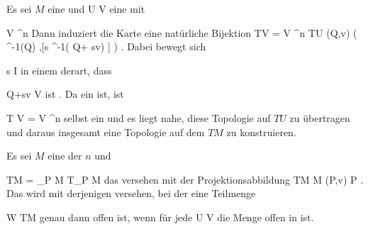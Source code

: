 {

Es sei $M$ eine
und
\maabbdisp {\alpha} { U } { V
} {}
eine
mit

\mavergleichskette
{\vergleichskette
{ V
}
{ \subseteq }{ \R^n
}
{  }{
}
{    }{
}
{   }{
}
}
{}{}{}
Dann induziert die Karte eine natürliche Bijektion
 {TV =  V \times \R^n } { TU
} {(Q,v)} { \left(  \alpha^{-1}(Q) ,[s \mapsto \alpha^{-1}( Q+ sv) ]  \right)
} {.}
Dabei bewegt sich

\mavergleichskette
{\vergleichskette
{ s
}
{ \in }{ I
}
{  }{
}
{    }{
}
{   }{
}
}
{}{}{}
in einem
derart, dass

\mavergleichskette
{\vergleichskette
{ Q+sv
}
{ \in }{ V
}
{  }{
}
{    }{
}
{   }{
}
}
{}{}{}
ist
 {} {.}
Da
 ein
ist, ist

\mavergleichskette
{\vergleichskette
{ T V
}
{ = }{ V \times \R^n
}
{  }{
}
{    }{
}
{   }{
}
}
{}{}{}
selbst ein
und es liegt nahe, diese Topologie auf $TU$ zu übertragen und daraus insgesamt eine Topologie auf dem
$TM$ zu konstruieren.

}

{}
{

Es sei $M$ eine
der
$n$ und

\mavergleichskettedisp
{\vergleichskette
{ TM
}
{ =} {\biguplus_{P \in M} T_P M
}
{ } {
}
{ } {
}
{ } {
}
}
{}{}{}
das
versehen mit der Projektionsabbildung
\maabbeledisp {\pi} { TM } { M
} { (P,v) } { P
} {.}
Das  wird mit derjenigen
versehen, bei der eine Teilmenge

\mavergleichskette
{\vergleichskette
{ W
}
{ \subseteq }{ TM
}
{  }{
}
{    }{
}
{   }{
}
}
{}{}{}
genau dann offen ist, wenn für jede
\maabbdisp {\alpha} { U } { V
} {}
die Menge
 offen in
 ist.

}

